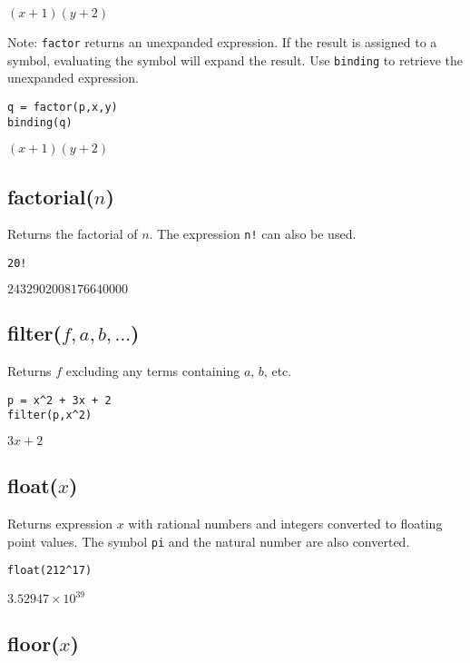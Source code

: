 \noindent
$\displaystyle (x+1)(y+2)$

\bigskip
\noindent
Note:
\verb$factor$
returns an unexpanded expression.
If the result is assigned to a symbol, evaluating the symbol will expand the result.
Use
\verb$binding$
to retrieve the unexpanded expression.

{\color{blue}
\begin{verbatim}
q = factor(p,x,y)
binding(q)
\end{verbatim}
}

\noindent
$\displaystyle (x+1)(y+2)$

\subsection*{factorial($n$)}

Returns the factorial of $n$.
The expression {\tt n!} can also be used.

{\color{blue}
\begin{verbatim}
20!
\end{verbatim}
}

\noindent
$2432902008176640000$

\subsection*{filter($f,a,b,\ldots$)}

Returns $f$ excluding any terms containing $a$, $b$, etc.

{\color{blue}
\begin{verbatim}
p = x^2 + 3x + 2
filter(p,x^2)
\end{verbatim}
}

\noindent
$3x+2$

\subsection*{float($x$)}

Returns expression $x$ with rational numbers and integers converted to
floating point values.
The symbol {\tt pi} and the natural number are also converted.

{\color{blue}
\begin{verbatim}
float(212^17)
\end{verbatim}
}

\noindent
$\displaystyle 3.52947\times 10^{39}$

\subsection*{floor($x$)}

